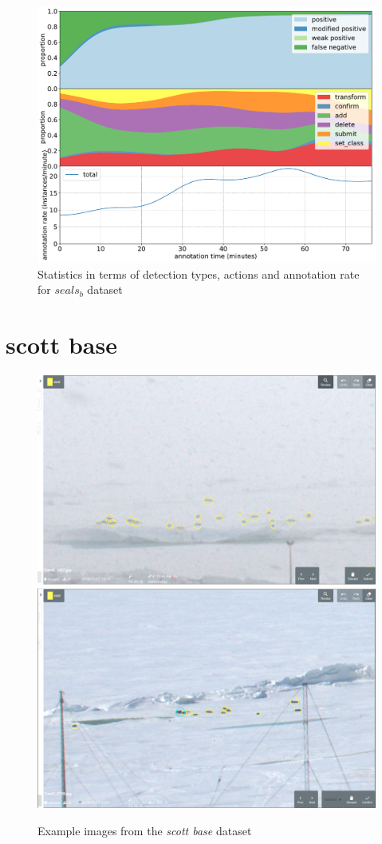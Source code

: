 \begin{figure}[!h]
\centering
\includegraphics[width=1.0\linewidth]{charts/action_annotations/seals2.pdf}
\caption{ Statistics in terms of detection types, actions and annotation rate for $seals_b$ dataset }
\label{fig:seals2_annotation}
\end{figure}

\pagebreak
\section {scott base}
\label{sec:scott_base_details}


\begin{figure}[!h]
\centering
  \includegraphics[width=0.475\linewidth]{figures/annotation/screenshots/scott_base_storm.png}
  \hfill
  \includegraphics[width=0.45\linewidth]{figures/annotation/screenshots/scott_base_sunny.png}
  \caption{}
\caption{ Example images from the \emph{scott base} dataset}
\label {fig:scott_base_examples}
\end{figure}

